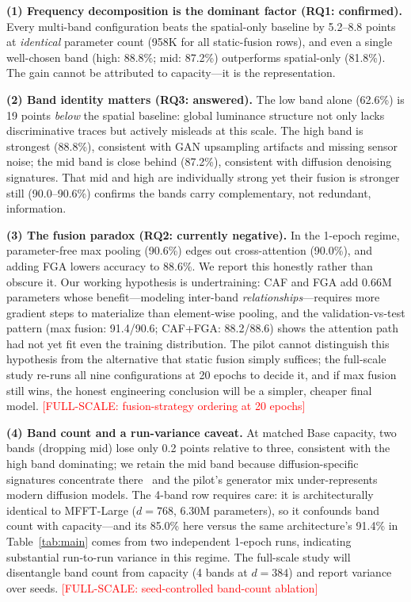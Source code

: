 \documentclass[journal]{IEEEtran}
\newcommand{\fullscale}[1]{\textcolor{red}{[FULL-SCALE: #1]}}
\begin{document}
\textbf{(1) Frequency decomposition is the dominant factor (RQ1: confirmed).} Every multi-band configuration beats the spatial-only baseline by 5.2--8.8 points at \emph{identical} parameter count (958K for all static-fusion rows), and even a single well-chosen band (high: 88.8\%; mid: 87.2\%) outperforms spatial-only (81.8\%). The gain cannot be attributed to capacity---it is the representation.

\textbf{(2) Band identity matters (RQ3: answered).} The low band alone (62.6\%) is 19 points \emph{below} the spatial baseline: global luminance structure not only lacks discriminative traces but actively misleads at this scale. The high band is strongest (88.8\%), consistent with GAN upsampling artifacts and missing sensor noise; the mid band is close behind (87.2\%), consistent with diffusion denoising signatures. That mid and high are individually strong yet their fusion is stronger still (90.0--90.6\%) confirms the bands carry complementary, not redundant, information.

\textbf{(3) The fusion paradox (RQ2: currently negative).} In the 1-epoch regime, parameter-free max pooling (90.6\%) edges out cross-attention (90.0\%), and adding FGA lowers accuracy to 88.6\%. We report this honestly rather than obscure it. Our working hypothesis is undertraining: CAF and FGA add 0.66M parameters whose benefit---modeling inter-band \emph{relationships}---requires more gradient steps to materialize than element-wise pooling, and the validation-vs-test pattern (max fusion: 91.4/90.6; CAF+FGA: 88.2/88.6) shows the attention path had not yet fit even the training distribution. The pilot cannot distinguish this hypothesis from the alternative that static fusion simply suffices; the full-scale study re-runs all nine configurations at 20 epochs to decide it, and if max fusion still wins, the honest engineering conclusion will be a simpler, cheaper final model. \fullscale{fusion-strategy ordering at 20 epochs}

\textbf{(4) Band count and a run-variance caveat.} At matched Base capacity, two bands (dropping mid) lose only 0.2 points relative to three, consistent with the high band dominating; we retain the mid band because diffusion-specific signatures concentrate there~\cite{corvi2023} and the pilot's generator mix under-represents modern diffusion models. The 4-band row requires care: it is architecturally identical to MFFT-Large ($d{=}768$, 6.30M parameters), so it confounds band count with capacity---and its 85.0\% here versus the same architecture's 91.4\% in Table~\ref{tab:main} comes from two independent 1-epoch runs, indicating substantial run-to-run variance in this regime. The full-scale study will disentangle band count from capacity (4 bands at $d{=}384$) and report variance over seeds. \fullscale{seed-controlled band-count ablation}
\end{document}
